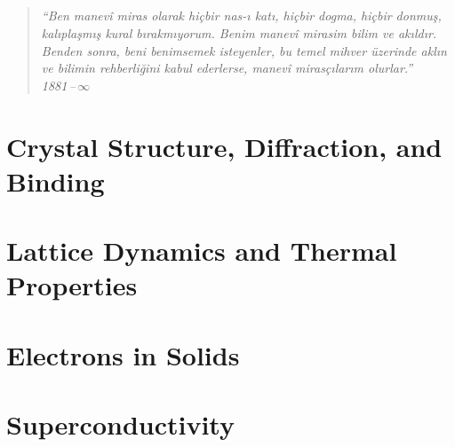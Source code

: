 \documentclass[12pt, oneside]{book}
\begin{document}
\chapter*{}
\begin{quote}
\textit{``Ben manev\^{i} miras olarak hi\c{c}bir nas-{\i} kat{\i}, hi\c{c}bir dogma, hi\c{c}bir donmu\c{s}, kal{\i}pla\c{s}m{\i}\c{s} kural b{\i}rakm{\i}yorum. Benim manev\^{i} mirasim bilim ve ak{\i}ld{\i}r. Benden sonra, beni benimsemek isteyenler, bu temel mihver \"uzerinde akl{\i}n ve bilimin rehberli\u{g}ini kabul ederlerse, manev\^{i} miras\c{c}{\i}lar{\i}m olurlar.''}
\\[0.5cm]
\textit{1881\,--\,$\infty$}
\end{quote}

\tableofcontents
\cleardoublepage

\part{Crystal Structure, Diffraction, and Binding}





\part{Lattice Dynamics and Thermal Properties}




\part{Electrons in Solids}






\part{Superconductivity}
\end{document}
